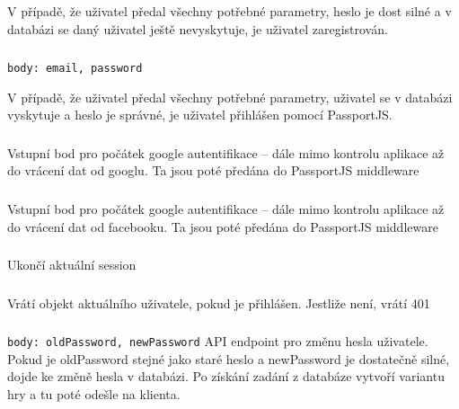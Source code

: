 \documentclass[a4paper,oneside,12pt]{report}
\begin{document}
V případě, že uživatel předal všechny potřebné parametry, heslo je dost silné a v databázi se daný uživatel ještě nevyskytuje, je uživatel zaregistrován.

\subsubsection{\color{apiblue}{POST -- /api/auth/login}}
\texttt{body: email, password} 

V případě, že uživatel předal všechny potřebné parametry, uživatel se v databázi vyskytuje a heslo je správné, je uživatel přihlášen pomocí PassportJS.

\subsubsection{\color{apigreen}{GET -- /api/auth/google}}
Vstupní bod pro počátek google autentifikace -- dále mimo kontrolu aplikace až do vrácení dat od googlu. Ta jsou poté předána do PassportJS middleware

\subsubsection{\color{apigreen}{GET -- /api/auth/facebook}}
Vstupní bod pro počátek google autentifikace -- dále mimo kontrolu aplikace až do vrácení dat od facebooku. Ta jsou poté předána do PassportJS middleware

\subsubsection{\color{apiblue}{POST -- /api/auth/logout}}
Ukončí aktuální session

\subsubsection{\color{apigreen}{GET -- /api/user}}
Vrátí objekt aktuálního uživatele, pokud je přihlášen. Jestliže není, vrátí 401

\subsubsection{\color{apiblue}{POST -- /api/user/password}}
\texttt{body: oldPassword, newPassword} 
API endpoint pro změnu hesla uživatele. Pokud je oldPassword stejné jako staré heslo a newPassword je dostatečně silné, dojde ke změně hesla v databázi. Po získání zadání z databáze vytvoří variantu hry a tu poté odešle na klienta.
\end{document}
